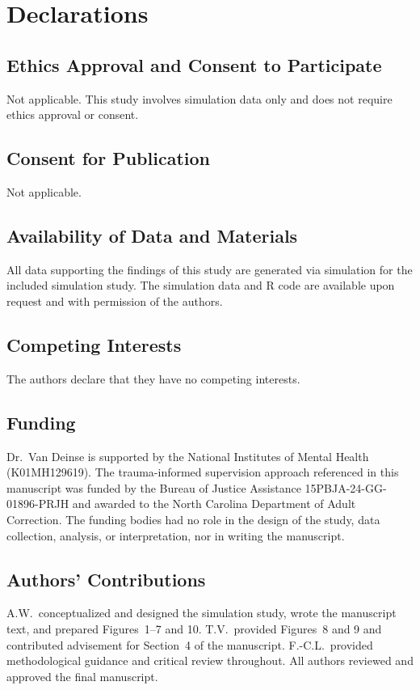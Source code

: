 \documentclass{article}[11pt]
\begin{document}
\section*{Declarations}

\subsection*{Ethics Approval and Consent to Participate}
Not applicable. This study involves simulation data only and does not require ethics approval or consent.

\subsection*{Consent for Publication}
Not applicable.

\subsection*{Availability of Data and Materials}
All data supporting the findings of this study are generated via simulation for the included simulation study. The simulation data and R code are available upon request and with permission of the authors.

\subsection*{Competing Interests}
The authors declare that they have no competing interests.

\subsection*{Funding}
Dr.\ Van Deinse is supported by the National Institutes of Mental Health (K01MH129619). The trauma-informed supervision approach referenced in this manuscript was funded by the Bureau of Justice Assistance 15PBJA-24-GG-01896-PRJH and awarded to the North Carolina Department of Adult Correction. The funding bodies had no role in the design of the study, data collection, analysis, or interpretation, nor in writing the manuscript.

\subsection*{Authors' Contributions}
A.W.\ conceptualized and designed the simulation study, wrote the manuscript text, and prepared Figures~1--7 and 10. T.V.\ provided Figures~8 and 9 and contributed advisement for Section~4 of the manuscript. F.-C.L.\ provided methodological guidance and critical review throughout. All authors reviewed and approved the final manuscript.
\end{document}
